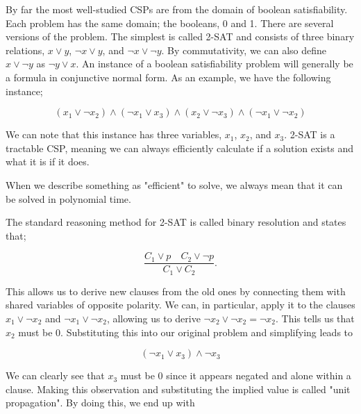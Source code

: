 By far the most well-studied CSPs are from the domain of boolean satisfiability. Each problem has the same domain; the booleans, 0 and 1. There are several versions of the problem. The simplest is called 2-SAT and consists of three binary relations, $x \vee y$, $\neg x \vee y$, and $\neg x \vee \neg y$. By commutativity, we can also define $x \vee \neg y$ as $\neg y \vee x$. An instance of a boolean satisfiability problem will generally be a formula in conjunctive normal form. As an example, we have the following instance;

\begin{equation}\label{equation:two-sat-example-pt1}
    (x_1 \lor \neg x_2) \land (\neg x_1 \lor x_3) \land (x_2 \lor \neg x_3) \land (\neg x_1 \lor \neg x_2)
\end{equation}

We can note that this instance has three variables, $x_1$, $x_2$, and $x_3$. 2-SAT is a tractable CSP, meaning we can always efficiently calculate if a solution exists and what it is if it does. 

\begin{remark}
    When we describe something as "efficient" to solve, we always mean that it can be solved in polynomial time.
\end{remark}

The standard reasoning method for 2-SAT is called binary resolution and states that;

\begin{equation}\label{equation:binary-resolution}
\frac{C_1 \lor p \quad C_2 \lor \neg p}{C_1 \lor C_2}.
\end{equation}

This allows us to derive new clauses from the old ones by connecting them with shared variables of opposite polarity. We can, in particular, apply it to the clauses $x_1 \lor \neg x_2$ and $\neg x_1 \lor \neg x_2$, allowing us to derive $\neg x_2 \lor \neg x_2 = \neg x_2$. This tells us that $x_2$ must be $0$. Substituting this into our original problem and simplifying leads to

\begin{equation}\label{equation:two-sat-example-pt2}
(\neg x_1 \lor x_3) \land \neg x_3
\end{equation}

We can clearly see that $x_3$ must be $0$ since it appears negated and alone within a clause. Making this observation and substituting the implied value is called "unit propagation".
By doing this, we end up with


